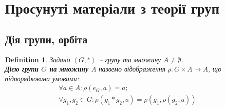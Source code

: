 \documentclass[a4paper, 10pt]{article}
\makeatletter
\theoremstyle{theoremdd}
\theoremstyle{theoremdd}
\newtheorem{definition}[theorem]{Definition}
\theoremstyle{theoremdd}
\theoremstyle{theoremdd}
\theoremstyle{theoremdd}
\theoremstyle{theoremdd}
\theoremstyle{theoremdd}
\theoremstyle{theoremdd}
\theoremstyle{theoremdd}
\theoremstyle{theoremdd}
\theoremstyle{theoremdd}
\theoremstyle{theoremdd}
\theoremstyle{theoremdd}
\theoremstyle{theoremdd}
\theoremstyle{theoremdd}
\renewenvironment{proof}[1][Proof.\\]{\par
\pushQED{\hfill \qed}%
\normalfont \topsep6\p@\@plus6\p@\relax
\trivlist
\item\relax
{\bfseries
#1\@addpunct{.}}\hspace\labelsep\ignorespaces
}{%
\popQED\endtrivlist\@endpefalse
}
\makeatother
\begin{document}
\iffalse
\begin{proof}
Установимо відображення $\varphi \colon G/_N \to G/_M$ таким чином: $g*N \mapsto g*M$.\\
Доведемо, що $\varphi$ є коректно визначеною функцією. Тому що дійсно, якщо є $g_1*N = g_2*N$, тоді $\varphi(g_1*N) = g_1*M$ та $\varphi(g_2*N) = g_2*M$ -- передали, по суті, один аргумент, а чи отримали одне й те саме, під питанням.\\
Оскільки $g_1*N = g_2*N$, то звідси $g_1*g_2^{-1} \in N$, але тоді $g_1*g_2^{-1} \in M$, тобто $g_1*M = g_2*M$. Отже, $\varphi(g_1*N) = \varphi(g_2*N)$.\\
$\varphi$ -- гомоморфізм, і це неважко:\\
$\varphi((g_1*N)*(g_2*N)) = \varphi((g_1*g_2)*N) = (g_1*g_2)*M = (g_1*M)*(g_2*M) = \varphi(g_1*N) * \varphi(g_2*N)$.\\
$\varphi$ -- сюр'єктивне відображення, бо якщо $g*M \in G/_M$, то тоді завжди можна знайти $g*N \in G/_N$, щоб $\varphi(g*N) = g*M$. Отже $\Im \varphi = G/_M$.\\
Нехай $g*N \in \ker \varphi$, або $\varphi(g*N) = e*M \iff g*M = M \iff \\ g \in M \iff g*N \in M/_N$, оскільки $g \in M$. Отже, $\ker \varphi = M/_N$.\\
За першою теоремою, про ізоморфізм, отримали ${G/_N}/_{M/_N} \cong G/_M$.
\end{proof}
\fi
\newpage

\section{Просунуті матеріали з теорії груп}
\subsection{Дія групи, орбіта}
\begin{definition}
Задано $\left< G,*\right>$ -- групу та множину $A \neq \emptyset$.\\
\textbf{Дією групи $G$ на множину $A$} назвемо відображення $\rho \colon G \times A \to A$, що підпорядкована умовами:
\begin{align*}
\forall a \in A: \rho(e_G,a) = a; \\
\forall g_1,g_2 \in G: \rho(g_1*g_2,a) = \rho(g_1,\rho(g_2,a))
\end{align*}
\end{definition}
\end{document}
